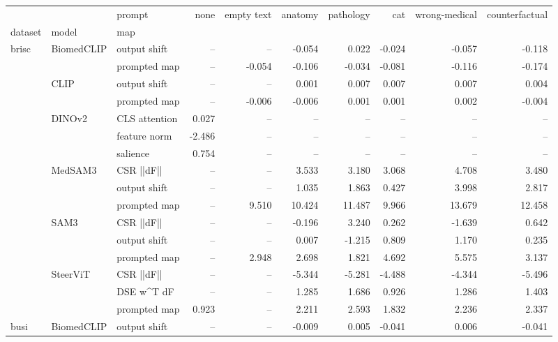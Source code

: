 \begin{tabular}{lllrrrrrrr}
\toprule
 &  & prompt & none & empty text & anatomy & pathology & cat & wrong-medical & counterfactual \\
dataset & model & map &  &  &  &  &  &  &  \\
\midrule
\multirow[t]{16}{*}{brisc} & \multirow[t]{2}{*}{BiomedCLIP} & output shift & -- & -- & -0.054 & 0.022 & -0.024 & -0.057 & -0.118 \\
 &  & prompted map & -- & -0.054 & -0.106 & -0.034 & -0.081 & -0.116 & -0.174 \\
\cline{2-10}
 & \multirow[t]{2}{*}{CLIP} & output shift & -- & -- & 0.001 & 0.007 & 0.007 & 0.007 & 0.004 \\
 &  & prompted map & -- & -0.006 & -0.006 & 0.001 & 0.001 & 0.002 & -0.004 \\
\cline{2-10}
 & \multirow[t]{3}{*}{DINOv2} & CLS attention & 0.027 & -- & -- & -- & -- & -- & -- \\
 &  & feature norm & -2.486 & -- & -- & -- & -- & -- & -- \\
 &  & salience & 0.754 & -- & -- & -- & -- & -- & -- \\
\cline{2-10}
 & \multirow[t]{3}{*}{MedSAM3} & CSR  ||dF|| & -- & -- & 3.533 & 3.180 & 3.068 & 4.708 & 3.480 \\
 &  & output shift & -- & -- & 1.035 & 1.863 & 0.427 & 3.998 & 2.817 \\
 &  & prompted map & -- & 9.510 & 10.424 & 11.487 & 9.966 & 13.679 & 12.458 \\
\cline{2-10}
 & \multirow[t]{3}{*}{SAM3} & CSR  ||dF|| & -- & -- & -0.196 & 3.240 & 0.262 & -1.639 & 0.642 \\
 &  & output shift & -- & -- & 0.007 & -1.215 & 0.809 & 1.170 & 0.235 \\
 &  & prompted map & -- & 2.948 & 2.698 & 1.821 & 4.692 & 5.575 & 3.137 \\
\cline{2-10}
 & \multirow[t]{3}{*}{SteerViT} & CSR  ||dF|| & -- & -- & -5.344 & -5.281 & -4.488 & -4.344 & -5.496 \\
 &  & DSE  w^T dF & -- & -- & 1.285 & 1.686 & 0.926 & 1.286 & 1.403 \\
 &  & prompted map & 0.923 & -- & 2.211 & 2.593 & 1.832 & 2.236 & 2.337 \\
\cline{1-10} \cline{2-10}
\multirow[t]{16}{*}{busi} & \multirow[t]{2}{*}{BiomedCLIP} & output shift & -- & -- & -0.009 & 0.005 & -0.041 & 0.006 & -0.041 \\

\end{tabular}
